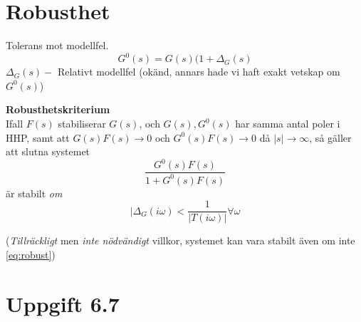\documentclass[12pt]{article}
\begin{document}
\section*{Robusthet}
Tolerans mot modellfel.
\[G^0(s) = G(s)(1 + \Delta_G(s)\]
$\Delta_G(s) -$ Relativt modellfel (okänd, annars hade vi haft exakt vetskap om $G^0(s)$)

\textbf{Robusthetskriterium} \\
Ifall $F(s)$ stabiliserar $G(s)$, och $G(s), G^0(s)$ har samma antal poler i HHP, samt att $G(s)F(s) \to 0$ och $G^0(s)F(s) \to 0$ då $|s| \to \infty$, så gäller att slutna systemet
\[\frac{G^0(s)F(s)}{1 + G^0(s)F(s)}\]
är stabilt \emph{om}
\begin{equation}
|\Delta_G(i\omega) < \frac{1}{|T(i\omega)|} \forall \omega\label{eq:robust}
\end{equation}

(\emph{Tillräckligt} men \emph{inte nödvändigt} villkor, systemet kan vara stabilt även om inte \eqref{eq:robust})

\section*{Uppgift 6.7}
\end{document}
